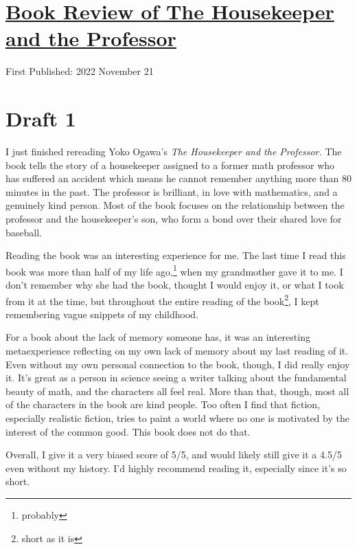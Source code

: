 \documentclass[12pt]{article}[titlepage]
\newcommand{\1}{\={a}}
\newcommand{\2}{\={e}}
\newcommand{\3}{\={\i}}
\newcommand{\4}{\=o}
\newcommand{\5}{\=u}
\newcommand{\6}{\={A}}
\renewcommand{\,}{\textsuperscript{,}}
\begin{document}
\doublespacing
\section{\href{book-review-housekeeper-professor-ogawa.html}{Book Review of The Housekeeper and the Professor}}
First Published: 2022 November 21
\section{Draft 1}
I just finished rereading Yoko Ogawa's \textit{The Housekeeper and the Professor.}
The book tells the story of a housekeeper assigned to a former math professor who has suffered an accident which means he cannot remember anything more than 80 minutes in the past.
The professor is brilliant, in love with mathematics, and a genuinely kind person.
Most of the book focuses on the relationship between the professor and the housekeeper's son, who form a bond over their shared love for baseball.

Reading the book was an interesting experience for me.
The last time I read this book was more than half of my life ago,\footnote{probably} when my grandmother gave it to me.
I don't remember why she had the book, thought I would enjoy it, or what I took from it at the time, but throughout the entire reading of the book\footnote{short as it is}, I kept remembering vague snippets of my childhood.

For a book about the lack of memory someone has, it was an interesting metaexperience reflecting on my own lack of memory about my last reading of it.
Even without my own personal connection to the book, though, I did really enjoy it.
It's great as a person in science seeing a writer talking about the fundamental beauty of math, and the characters all feel real.
More than that, though, most all of the characters in the book are kind people.
Too often I find that fiction, especially realistic fiction, tries to paint a world where no one is motivated by the interest of the common good.
This book does not do that.

Overall, I give it a very biased score of 5/5, and would likely still give it a 4.5/5 even without my history.
I'd highly recommend reading it, especially since it's so short.
\end{document}
